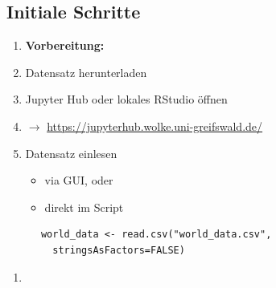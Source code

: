 \documentclass[aspectratio=169, journal, x11names, unknownkeysallowed, hyperref={colorlinks,
linkcolor = SS2,
urlcolor  = F3,
citecolor = F3,
anchorcolor = A4}, 12pt]{beamer}
\newcommand{\oarrow}{\textcolor{A1}{$\rightarrow$} }
\begin{document}
  \subsection{Initiale Schritte}
    \begin{frame}[t, fragile]
      \begin{minipage}[t]{0.45\textwidth}
          \begin{enumerate}
              \item[] \textbf{Vorbereitung:}
              \item Datensatz herunterladen
              \item Jupyter Hub oder lokales RStudio öffnen 
              \item[] \oarrow \url{https://jupyterhub.wolke.uni-greifswald.de/}
              \item Datensatz einlesen
              \begin{itemize}
                \item via GUI, oder
                \item direkt im Script
              \end{itemize}
          \end{enumerate}
            \begin{lstlisting}
      world_data <- read.csv("world_data.csv",
        stringsAsFactors=FALSE)
            \end{lstlisting}
        \end{minipage}
        \begin{minipage}[t]{0.45\textwidth}
          \begin{enumerate}
            \item[] 
          \end{enumerate}
        \end{minipage}
    \end{frame}
\end{document}
